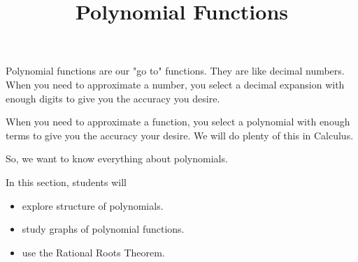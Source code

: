 \documentclass{ximera}
\title{Polynomial Functions}
\begin{document}
\begin{abstract}
\end{abstract}
\maketitle






Polynomial functions are our "go to" functions.  They are like decimal numbers.  When you need to approximate a number, you select a decimal expansion with enough digits to give you the accuracy you desire.

When you need to approximate a function, you select a polynomial with enough terms to give you the accuracy your desire. We will do plenty of this in Calculus.

So, we want to know everything about polynomials.


















\begin{sectionOutcomes}
In this section, students will 

\begin{itemize}
\item explore structure of polynomials.
\item study graphs of polynomial functions.
\item use the Rational Roots Theorem.
\end{itemize}
\end{sectionOutcomes}
\end{document}
